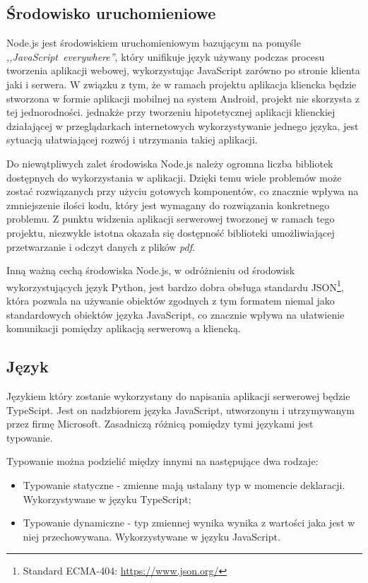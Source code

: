 \documentclass[a4paper,12pt,twoside,openany]{report}
\begin{document}
\subsection{Środowisko uruchomieniowe}
Node.js jest środowiskiem uruchomieniowym bazującym na pomyśle \textit{,,JavaScript~everywhere''}, który unifikuje język używany podczas procesu tworzenia aplikacji webowej, wykorzystując JavaScript zarówno po stronie klienta jaki i serwera. W związku z tym, że w ramach projektu aplikacja kliencka będzie stworzona w formie aplikacji mobilnej na system Android, projekt nie skorzysta z tej jednorodności. jednakże przy tworzeniu hipotetycznej aplikacji klienckiej działającej w przeglądarkach internetowych wykorzystywanie jednego języka, jest  sytuacją ułatwiającej rozwój i utrzymania takiej aplikacji.

Do niewątpliwych zalet środowiska Node.js należy ogromna liczba bibliotek dostępnych do wykorzystania w aplikacji. Dzięki temu wiele problemów może zostać rozwiązanych przy użyciu gotowych komponentów, co znacznie wpływa na zmniejszenie ilości kodu, który jest wymagany do rozwiązania konkretnego problemu. Z punktu widzenia aplikacji serwerowej tworzonej w ramach tego projektu, niezwykle istotna okazała się dostępność biblioteki umożliwiającej przetwarzanie i odczyt danych z plików \textit{pdf}. 

Inną ważną cechą środowiska Node.js, w odróżnieniu od środowisk wykorzystujących  język Python, jest bardzo dobra obsługa standardu JSON\footnote{Standard ECMA-404: \url{https://www.json.org/}}, która pozwala na używanie obiektów zgodnych z tym formatem niemal jako standardowych obiektów języka JavaScript, co znacznie wpływa na ułatwienie komunikacji pomiędzy aplikacją serwerową a kliencką. 

\subsection{Język}
Językiem który zostanie wykorzystany do napisania aplikacji serwerowej będzie TypeScipt. Jest on nadzbiorem języka JavaScript, utworzonym i utrzymywanym przez firmę Microsoft. Zasadniczą różnicą pomiędzy tymi językami jest typowanie.

Typowanie można podzielić między innymi na następujące dwa rodzaje:
\begin{itemize}
	\item Typowanie statyczne - zmienne mają ustalany typ w momencie deklaracji. Wykorzystywane w języku TypeScript;
	\item Typowanie dynamiczne -  typ zmiennej wynika wynika z wartości jaka jest w niej przechowywana. Wykorzystywane w języku JavaScript.
\end{itemize}
\end{document}
